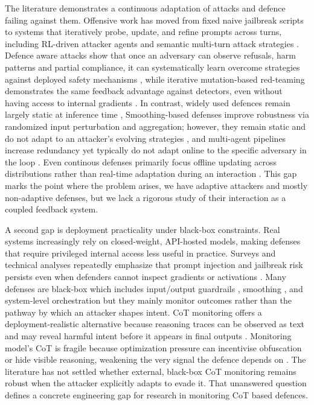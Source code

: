 \documentclass[conference]{IEEEtran}
\begin{document}
The literature demonstrates a continuous adaptation of attacks and defence failing against them. Offensive work has moved from fixed naive jailbreak scripts to systems that iteratively probe, update, and refine prompts across turns, including RL-driven attacker agents and semantic multi-turn attack strategies \cite{b14,b15}. Defence aware attacks show that once an adversary can observe refusals, harm patterns and partial compliance, it can systematically learn overcome strategies against deployed safety mechanisms \cite{b16}, while iterative mutation-based red-teaming demonstrates the same feedback advantage against detectors, even without having access to internal gradients \cite{b13}. In contrast, widely used defences remain largely static at inference time \cite{b17}, Smoothing-based defenses improve robustness via randomized input perturbation and aggregation; however, they remain static and do not adapt to an attacker’s evolving strategies \cite{b18}, and multi-agent pipelines increase redundancy yet typically do not adapt online to the specific adversary in the loop \cite{b19}. Even continous defenses primarily focus offline updating across distributions rather than real-time adaptation during an interaction \cite{b22}. This gap marks the point where the problem arises, we have adaptive attackers and mostly non-adaptive defenses, but we lack a rigorous study of their interaction as a coupled feedback system. 

A second gap is deployment practicality under black-box constraints. Real systems increasingly rely on closed-weight, API-hosted models, making defenses that require privileged internal access less useful in practice. Surveys and technical analyses repeatedly emphasize that prompt injection and jailbreak risk persists even when defenders cannot inspect gradients or activations \cite{b1,b2,b3,b4}. Many defenses are black-box which includes input/output guardrails \cite{b17}, smoothing \cite{b18}, and system-level orchestration \cite{b19,b20} but they mainly monitor outcomes rather than the pathway by which an attacker shapes intent. CoT monitoring offers a deployment-realistic alternative because reasoning traces can be observed as text and may reveal harmful intent before it appears in final outputs \cite{b6}. Monitoring model’s CoT is fragile because optimization pressure can incentivise obfuscation or hide visible reasoning, weakening the very signal the defence depends on \cite{b7}. The literature has not settled whether external, black-box CoT monitoring remains robust when the attacker explicitly adapts to evade it. That unanswered question defines a concrete engineering gap for research in monitoring CoT based defences.
\end{document}
